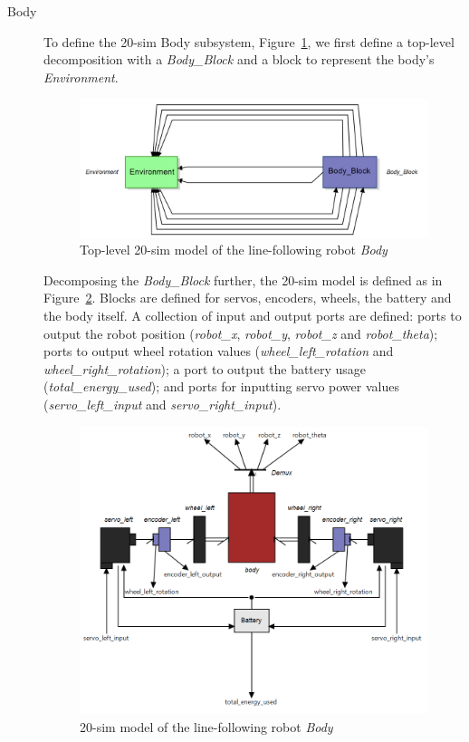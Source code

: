 \begin{description}
\item[Body] To define the 20-sim Body subsystem, Figure~\ref{fig:linefollow20simmod}, we first define a top-level decomposition with a \emph{Body\_Block} and a block to represent the body's \emph{Environment}. 

\begin{figure}[htb!]
\begin{center}
  \includegraphics[width=0.65\linewidth]{linefollower/r2g2t_mod2} 
\caption{Top-level 20-sim model of the line-following robot \emph{Body}}
\label{fig:linefollow20simmod}
\end{center}
\end{figure}

Decomposing the \emph{Body\_Block} further, the 20-sim model is defined as in Figure~\ref{fig:linefollowbody20simmm}. Blocks are defined for servos, encoders, wheels, the battery and the body itself. A collection of input and output ports are defined: ports to output the robot position (\emph{robot\_x}, \emph{robot\_y}, \emph{robot\_z} and \emph{robot\_theta}); ports to output wheel rotation values (\emph{wheel\_left\_rotation} and \emph{wheel\_right\_rotation}); a port to output the battery usage (\emph{total\_energy\_used}); and ports for inputting servo power values (\emph{servo\_left\_input} and \emph{servo\_right\_input}).

\begin{figure}[htb!]
\begin{center}
     \includegraphics[width=0.7\linewidth]{linefollower/r2g2p_body} 
\caption{20-sim model of the line-following robot \emph{Body}}
\label{fig:linefollowbody20simmm}
\end{center}
\end{figure}




\end{description}
